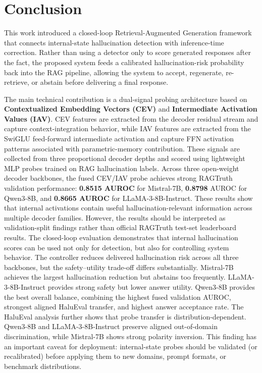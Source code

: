 \chapter{Conclusion}
\label{ch:conclusion}

This work introduced a closed-loop Retrieval-Augmented Generation framework that connects internal-state hallucination detection with inference-time correction. Rather than using a detector only to score generated responses after the fact, the proposed system feeds a calibrated hallucination-risk probability back into the RAG pipeline, allowing the system to accept, regenerate, re-retrieve, or abstain before delivering a final response.
\vspace{0.3cm}

The main technical contribution is a dual-signal probing architecture based on \textbf{Contextualized Embedding Vectors (CEV)} and \textbf{Intermediate Activation Values (IAV)}. CEV features are extracted from the decoder residual stream and capture context-integration behavior, while IAV features are extracted from the SwiGLU feed-forward intermediate activation and capture FFN activation patterns associated with parametric-memory contribution. These signals are collected from three proportional decoder depths and scored using lightweight MLP probes trained on RAG hallucination labels.
\vspace{0.3cm}
Across three open-weight decoder backbones, the fused CEV/IAV probe achieves strong RAGTruth validation performance: \textbf{0.8515 AUROC} for Mistral-7B, \textbf{0.8798} AUROC for Qwen3-8B, and \textbf{0.8665 AUROC} for LLaMA-3-8B-Instruct. These results show that internal activations contain useful hallucination-relevant information across multiple decoder families. However, the results should be interpreted as validation-split findings rather than official RAGTruth test-set leaderboard results.
\vspace{0.3cm}
The closed-loop evaluation demonstrates that internal hallucination scores can be used not only for detection, but also for controlling system behavior. The controller reduces delivered hallucination risk across all three backbones, but the safety–utility trade-off differs substantially. Mistral-7B achieves the largest hallucination reduction but abstains too frequently. LLaMA-3-8B-Instruct provides strong safety but lower answer utility. Qwen3-8B provides the best overall balance, combining the highest fused validation AUROC, strongest aligned HaluEval transfer, and highest answer acceptance rate.
The HaluEval analysis further shows that probe transfer is distribution-dependent. Qwen3-8B and LLaMA-3-8B-Instruct preserve aligned out-of-domain discrimination, while Mistral-7B shows strong polarity inversion. This finding has an important caveat for deployment: internal-state probes should be validated (or recalibrated) before applying them to new domains, prompt formats, or benchmark distributions.
